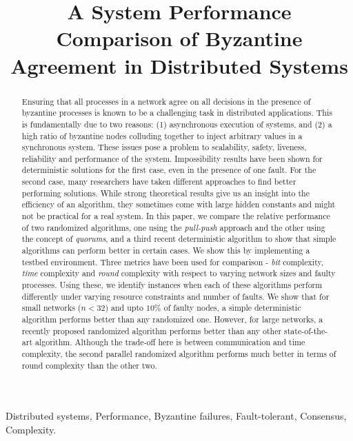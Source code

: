 \title{A System Performance Comparison of Byzantine Agreement in Distributed Systems}


%

\maketitle

\begin{abstract}

Ensuring that all processes in a network agree on all decisions in the
presence of byzantine processes is known to be a challenging task in
distributed applications. This is fundamentally due to two reasons: (1)
asynchronous execution of systems, and (2) a high ratio of byzantine
nodes colluding together to inject arbitrary values in a synchronous
system. These issues pose a problem to scalability, safety, liveness,
reliability and performance of the system. Impossibility results have
been shown for deterministic solutions for the first case, even in the
presence of one fault. For the second case, many researchers have taken
different approaches to find better performing solutions. While strong
theoretical results give us an insight into the efficiency of an
algorithm, they sometimes come with large hidden constants and might not
be practical for a real system. In this paper, we compare the relative
performance of two randomized algorithms, one using the {\em pull-push} approach
and the other using the concept of {\em quorums}, and a third recent
deterministic algorithm to show that simple algorithms can perform
better in certain cases. We show this by implementing a testbed
environment. Three metrics have been used for comparison - {\em bit}
complexity, {\em time} complexity and {\em round} complexity with respect to varying network sizes and
faulty processes. Using these, we identify instances when each of these
algorithms perform differently under varying resource constraints and
number of faults. We show that for small networks ($n<32$) and upto $10\%$ of faulty nodes, a simple deterministic algorithm performs better than any randomized one. However, for large networks, a recently proposed randomized algorithm performs better than any other state-of-the-art algorithm. Although the trade-off here is between communication and time complexity, the second parallel randomized algorithm performs much better in terms of round complexity than the other two. 

\end{abstract}

 Distributed systems, Performance, Byzantine failures, Fault-tolerant, Consensus, Complexity.
